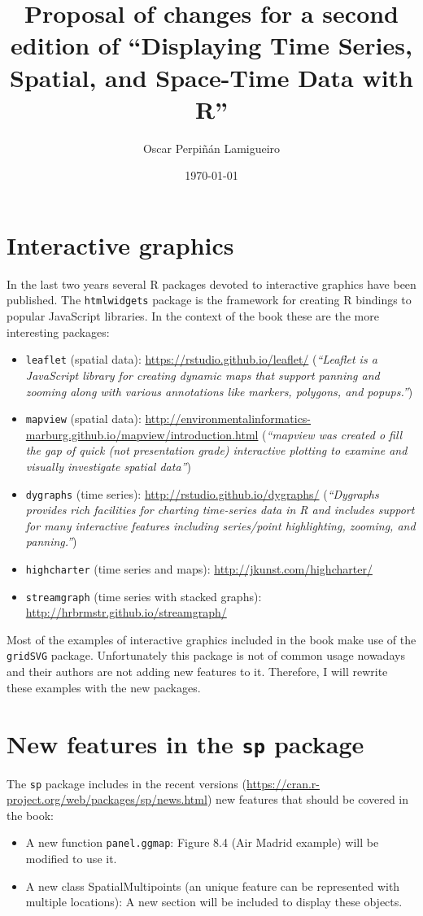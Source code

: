 \documentclass[11pt]{article}
\author{Oscar Perpiñán Lamigueiro}
\date{\today}
\title{Proposal of changes for a second edition of ``Displaying Time Series, Spatial, and Space-Time Data with R''}
\begin{document}
\maketitle


\section{Interactive graphics}
\label{sec:org11abd04}

In the last two years several R packages devoted to interactive graphics have been published. The \texttt{htmlwidgets} package is the framework for creating R bindings to popular JavaScript libraries. In the context of the book these are the more interesting packages:

\begin{itemize}
\item \texttt{leaflet} (spatial data): \url{https://rstudio.github.io/leaflet/} (\emph{``Leaflet is a JavaScript library for creating dynamic maps that support panning and zooming along with various annotations like markers, polygons, and popups.''})
\item \texttt{mapview} (spatial data): \url{http://environmentalinformatics-marburg.github.io/mapview/introduction.html} (\emph{``mapview was created o fill the gap of quick (not presentation grade) interactive plotting to examine and visually investigate spatial data''})
\item \texttt{dygraphs} (time series): \url{http://rstudio.github.io/dygraphs/} (\emph{``Dygraphs provides rich facilities for charting time-series data in R and includes support for many interactive features including series/point highlighting, zooming, and panning.''})
\item \texttt{highcharter} (time series and maps): \url{http://jkunst.com/highcharter/}
\item \texttt{streamgraph} (time series with stacked graphs): \url{http://hrbrmstr.github.io/streamgraph/}
\end{itemize}


Most of the examples of interactive graphics included in the book make use of the \texttt{gridSVG} package. Unfortunately this package is not of common usage nowadays and their authors are not adding new features to it. Therefore, I will rewrite these examples with the new packages.

\section{New features in the \texttt{sp} package}
\label{sec:orgbbd81fb}
The \texttt{sp} package includes in the recent versions (\url{https://cran.r-project.org/web/packages/sp/news.html}) new features that should be covered in the book:
\begin{itemize}
\item A new function \texttt{panel.ggmap}: Figure 8.4 (Air Madrid example) will be modified to use it.
\item A new class SpatialMultipoints (an unique feature can be represented with multiple locations): A new section will be included to display these objects.
\end{itemize}
\end{document}
